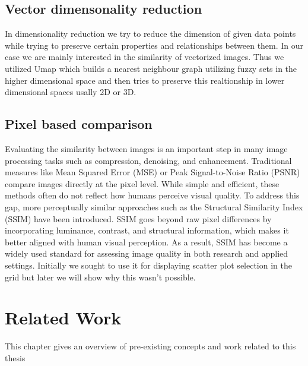 \documentclass[
  a4paper,  %
  twoside,  %
  bibliography=totoc,
  headsepline,
  cleardoublepage=empty,
  parskip=half,
  draft=false
]{scrbook}
\begin{document}
\section{Vector dimensonality reduction}
\label{dimRed}
In dimensionality reduction we try to reduce the dimension of given data points while trying to preserve certain properties and relationships between them. In our case we are mainly interested in the similarity of vectorized images. Thus we utilized Umap \cite{umap} which builds a nearest neighbour graph utilizing fuzzy sets in the higher dimensional space and then tries to preserve this realtionship in lower dimensional spaces usally 2D or 3D. 


\section{Pixel based comparison}
\label{sec:pixComp}
Evaluating the similarity between images is an important step in many image processing tasks such as compression, denoising, and enhancement. Traditional measures like Mean Squared Error (MSE) \cite{wang2009mse} or Peak Signal-to-Noise Ratio (PSNR) \cite{hore2010psnr} compare images directly at the pixel level. While simple and efficient, these methods often do not reflect how humans perceive visual quality. To address this gap, more perceptually similar approaches such as the Structural Similarity Index (SSIM) \cite{ssim} have been introduced. SSIM goes beyond raw pixel differences by incorporating luminance, contrast, and structural information, which makes it better aligned with human visual perception. As a result, SSIM has become a widely used standard for assessing image quality in both research and applied settings. Initially we sought to use it for displaying scatter plot selection in the grid but later we will show why this wasn't possible.





\chapter{Related Work}
This chapter gives an overview of pre-existing concepts and work related to this thesis 
\end{document}
